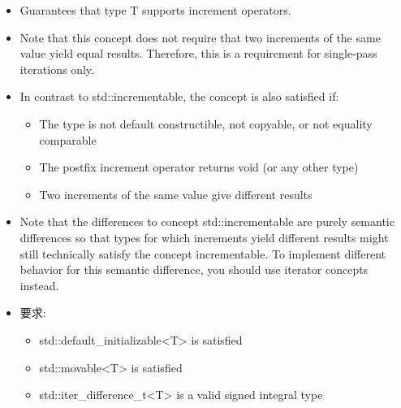 

\begin{itemize}
\item
Guarantees that type T supports increment operators.

\item
Note that this concept does not require that two increments of the same value yield equal results. Therefore, this is a requirement for single-pass iterations only.

\item
In contrast to std::incrementable, the concept is also satisfied if:

\begin{itemize}
\item
The type is not default constructible, not copyable, or not equality comparable

\item
The postfix increment operator returns void (or any other type)

\item
Two increments of the same value give different results
\end{itemize}

\item
Note that the differences to concept std::incrementable are purely semantic differences so that types for which increments yield different results might still technically satisfy the concept incrementable. To implement different behavior for this semantic difference, you should use iterator concepts instead.

\item
要求:
\begin{itemize}
\item
std::default\_initializable<T> is satisfied

\item
std::movable<T> is satisfied

\item
std::iter\_difference\_t<T> is a valid signed integral type
\end{itemize}
\end{itemize}


